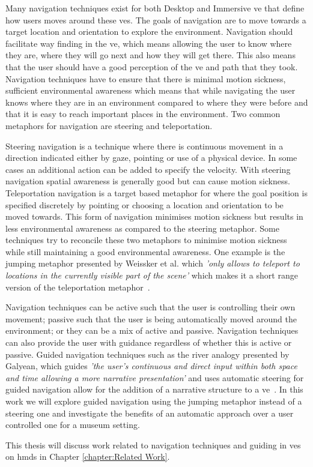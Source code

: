 %
%
\label{Chapter:Introduction}
Many navigation techniques exist for both Desktop and Immersive \acrfull{ve} that define how users moves around these \acrshort{ve}s. The goals of navigation are to move towards a target location and orientation to explore the environment. Navigation should facilitate way finding in the \acrshort{ve}, which means allowing the user to know where they are, where they will go next and how they will get there. This also means that the user should have a good perception of the \acrshort{ve} and path that they took. Navigation techniques have to ensure that there is minimal motion sickness, sufficient environmental awareness which means that while navigating the user knows where they are in an environment compared to where they were before and that it is easy to reach important places in the environment. Two common metaphors for navigation are steering and teleportation.

Steering navigation is a technique where there is continuous movement in a direction indicated either by gaze, pointing or use of a physical device. In some cases an additional action can be added to specify the velocity. With steering navigation spatial awareness is generally good but can cause motion sickness. Teleportation navigation is a target based metaphor for where the goal position is specified discretely by pointing or choosing a location and orientation to be moved towards. This form of navigation minimises motion sickness but results in less environmental awareness as compared to the steering metaphor. Some techniques try to reconcile these two metaphors to minimise motion sickness while still maintaining a good environmental awareness. One example is the jumping metaphor presented by Weissker et al. which \textit{'only allows to teleport to locations in the currently visible part of the scene'} which makes it a short range version of the teleportation metaphor~\cite{Weissker2018}. 

Navigation techniques can be active such that the user is controlling their own movement; passive such that the user is being automatically moved around the environment; or they can be a mix of active and passive. Navigation techniques can also provide the user with guidance regardless of whether this is active or passive. Guided navigation techniques such as the river analogy presented by Galyean, which guides \textit{'the user’s continuous and direct input within both space and time allowing a more narrative presentation'} and uses automatic steering for guided navigation allow for the addition of a narrative structure to a \acrshort{ve}~\cite{Galyean1995}. In this work we will explore guided navigation using the jumping metaphor instead of a steering one and investigate the benefits of an automatic approach over a user controlled one for a museum setting. 

This thesis will discuss work related to navigation techniques and guiding in \acrshort{ve}s on \acrfull{hmd}s in Chapter \ref{chapter:Related Work}. 
